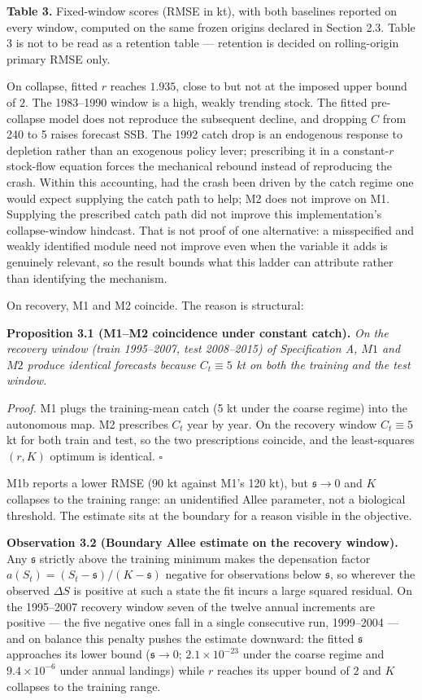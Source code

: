 \documentclass[11pt]{article}
\begin{document}
\textbf{Table 3.} Fixed-window scores (RMSE in kt), with both baselines
reported on every window, computed on the same frozen origins declared
in Section 2.3. Table 3 is not to be read as a retention table ---
retention is decided on rolling-origin primary RMSE only.



On collapse, fitted \(r\) reaches \(1.935\), close to but not at the
imposed upper bound of \(2\).
The 1983--1990 window is a high, weakly trending stock. The fitted pre-collapse model does not reproduce the subsequent
decline, and dropping \(C\) from 240 to 5 raises forecast SSB. The 1992 catch drop is an
endogenous response to depletion rather than an exogenous policy lever;
prescribing it in a constant-\(r\) stock-flow equation forces the
mechanical rebound instead of reproducing the crash. Within this
accounting, had the crash been driven by the catch regime one would
expect supplying the catch path to help; M2 does not improve on M1. Supplying the prescribed catch path did not improve this
implementation's collapse-window hindcast. That is not proof of one
alternative: a misspecified and weakly identified module need not
improve even when the variable it adds is genuinely relevant, so the
result bounds what this ladder can attribute rather than identifying the
mechanism.

On recovery, M1 and M2 coincide. The reason is structural:

\textbf{Proposition 3.1 (M1--M2 coincidence under constant catch).}
\emph{On the recovery window (train 1995--2007, test 2008--2015) of
Specification A, \(M1\) and \(M2\) produce identical forecasts because
\(C_t\equiv 5\) kt on both the training and the test window.}

\emph{Proof.} M1 plugs the training-mean catch (5 kt under the coarse
regime) into the autonomous map. M2 prescribes \(C_t\) year by year. On
the recovery window \(C_t\equiv 5\) kt for both train and test, so the
two prescriptions coincide, and the least-squares \((r,K)\) optimum is
identical. \ensuremath{\square}

M1b reports a lower RMSE (90 kt against M1's 120 kt), but
\(\mathfrak s\to 0\) and \(K\) collapses to the training range: an
unidentified Allee parameter, not a biological threshold. The estimate
sits at the boundary for a reason visible in the objective.

\textbf{Observation 3.2 (Boundary Allee estimate on the recovery
window).} Any \(\mathfrak s\) strictly above the training minimum makes
the depensation factor
\(a(S_t)=(S_t-\mathfrak s)/(K-\mathfrak s)\) negative for observations
below \(\mathfrak s\), so wherever the observed \(\Delta S\) is positive
at such a state the fit incurs a large squared residual. On the
1995--2007 recovery window seven of the twelve annual increments are
positive --- the five negative ones fall in a single consecutive run,
1999--2004 --- and on balance this penalty pushes the estimate downward: the fitted \(\mathfrak s\)
approaches its lower bound (\(\mathfrak s \to 0\); \(2.1\times10^{-23}\)
under the coarse regime and \(9.4\times10^{-6}\) under annual landings)
while \(r\) reaches its upper bound of \(2\) and \(K\) collapses to the
training range.
\end{document}
